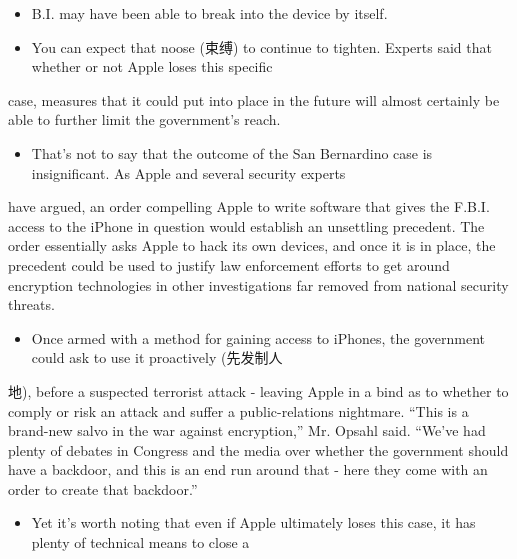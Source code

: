 \documentclass[UTF8,11pt]{ctexart}
\begin{document}
\begin{itemize}[leftmargin=2em,itemsep=.2em,topsep=.4em]\item[F.] B.I. may have been able to break into the device by itself.
\item[K.] You can expect that noose (束缚) to continue to tighten. Experts said that whether or not Apple loses this specific
\end{itemize}

case, measures that it could put into place in the future will almost certainly be able to further limit the government’s reach.


\begin{itemize}[leftmargin=2em,itemsep=.2em,topsep=.4em]\item[L.] That’s not to say that the outcome of the San Bernardino case is insignificant. As Apple and several security experts
\end{itemize}

have argued, an order compelling Apple to write software that gives the F.B.I. access to the iPhone in question would establish an unsettling precedent. The order essentially asks Apple to hack its own devices, and once it is in place, the precedent could be used to justify law enforcement efforts to get around encryption technologies in other investigations far removed from national security threats.


\begin{itemize}[leftmargin=2em,itemsep=.2em,topsep=.4em]\item[M.] Once armed with a method for gaining access to iPhones, the government could ask to use it proactively (先发制人
\end{itemize}

地), before a suspected terrorist attack - leaving Apple in a bind as to whether to comply or risk an attack and suffer a public-relations nightmare. “This is a brand-new salvo in the war against encryption,” Mr. Opsahl said. “We’ve had plenty of debates in Congress and the media over whether the government should have a backdoor, and this is an end run around that - here they come with an order to create that backdoor.”


\begin{itemize}[leftmargin=2em,itemsep=.2em,topsep=.4em]\item[N.] Yet it’s worth noting that even if Apple ultimately loses this case, it has plenty of technical means to close a
\end{itemize}
\end{document}
